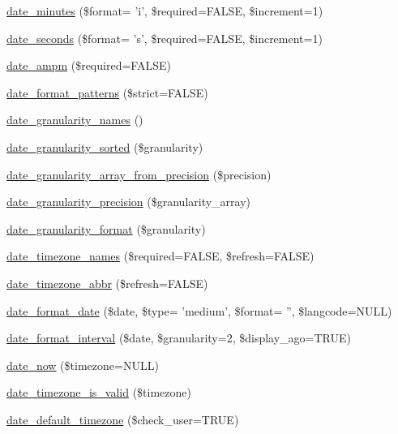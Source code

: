 \begin{DoxyCompactItemize}
\item 
\hyperlink{date__api_8module_ab545057ba7104d45f9a4424ba2c26227}{date\_\-minutes} (\$format= 'i', \$required=FALSE, \$increment=1)
\item 
\hyperlink{date__api_8module_aa5d254f03ee4a981113f8f9874d2915c}{date\_\-seconds} (\$format= 's', \$required=FALSE, \$increment=1)
\item 
\hyperlink{date__api_8module_a111c565d163ccc8078a24ef9ed9a642f}{date\_\-ampm} (\$required=FALSE)
\item 
\hyperlink{date__api_8module_a85d53d55109a56f5685f0c0ca0557a55}{date\_\-format\_\-patterns} (\$strict=FALSE)
\item 
\hyperlink{date__api_8module_ae1883963cdb47632622f313139f35839}{date\_\-granularity\_\-names} ()
\item 
\hyperlink{date__api_8module_ad1999b95cf5c3ceb6672adbe08260a24}{date\_\-granularity\_\-sorted} (\$granularity)
\item 
\hyperlink{date__api_8module_a25e9d06fc1a832df3fa5ce5989039dcf}{date\_\-granularity\_\-array\_\-from\_\-precision} (\$precision)
\item 
\hyperlink{date__api_8module_af1576bf465ba626636ebe74667618c55}{date\_\-granularity\_\-precision} (\$granularity\_\-array)
\item 
\hyperlink{date__api_8module_ab17bb31df64a3d11cf8bddb49f5e20fd}{date\_\-granularity\_\-format} (\$granularity)
\item 
\hyperlink{date__api_8module_ab90af298d216e34744c9d3ee7cf7d23a}{date\_\-timezone\_\-names} (\$required=FALSE, \$refresh=FALSE)
\item 
\hyperlink{date__api_8module_acc8ac7f6a9a71d3f679af4d130a97843}{date\_\-timezone\_\-abbr} (\$refresh=FALSE)
\item 
\hyperlink{date__api_8module_a1c866f42568c36b77ab275733dce0da4}{date\_\-format\_\-date} (\$date, \$type= 'medium', \$format= '', \$langcode=NULL)
\item 
\hyperlink{date__api_8module_a3a94e28f9a43be71c87afdf5e791b9a0}{date\_\-format\_\-interval} (\$date, \$granularity=2, \$display\_\-ago=TRUE)
\item 
\hyperlink{date__api_8module_aa5e548195859cb8de5c160dda99f1877}{date\_\-now} (\$timezone=NULL)
\item 
\hyperlink{date__api_8module_a319c7986532f87064916552af178c58c}{date\_\-timezone\_\-is\_\-valid} (\$timezone)
\item 
\hyperlink{date__api_8module_a0804735c8d110e91ba3129bef5d8ec78}{date\_\-default\_\-timezone} (\$check\_\-user=TRUE)

\end{DoxyCompactItemize}
